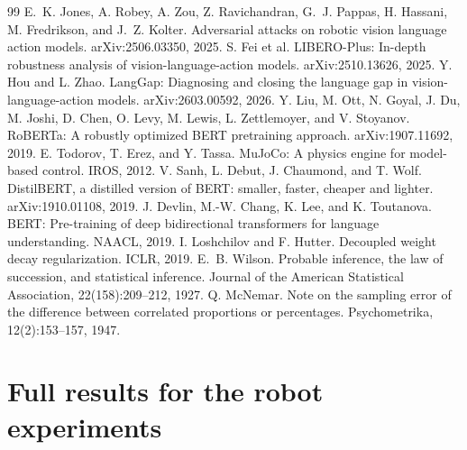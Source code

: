 \documentclass{article}
\begin{document}
\begin{thebibliography}{99}
 E.~K. Jones, A. Robey, A. Zou, Z. Ravichandran, G.~J. Pappas, H. Hassani, M. Fredrikson, and J.~Z. Kolter. Adversarial attacks on robotic vision language action models. arXiv:2506.03350, 2025.
 S. Fei et al. LIBERO-Plus: In-depth robustness analysis of vision-language-action models. arXiv:2510.13626, 2025.
 Y. Hou and L. Zhao. LangGap: Diagnosing and closing the language gap in vision-language-action models. arXiv:2603.00592, 2026.
 Y. Liu, M. Ott, N. Goyal, J. Du, M. Joshi, D. Chen, O. Levy, M. Lewis, L. Zettlemoyer, and V. Stoyanov. RoBERTa: A robustly optimized BERT pretraining approach. arXiv:1907.11692, 2019.
 E. Todorov, T. Erez, and Y. Tassa. MuJoCo: A physics engine for model-based control. IROS, 2012.
 V. Sanh, L. Debut, J. Chaumond, and T. Wolf. DistilBERT, a distilled version of BERT: smaller, faster, cheaper and lighter. arXiv:1910.01108, 2019.
 J. Devlin, M.-W. Chang, K. Lee, and K. Toutanova. BERT: Pre-training of deep bidirectional transformers for language understanding. NAACL, 2019.
 I. Loshchilov and F. Hutter. Decoupled weight decay regularization. ICLR, 2019.
 E.~B. Wilson. Probable inference, the law of succession, and statistical inference. Journal of the American Statistical Association, 22(158):209--212, 1927.
 Q. McNemar. Note on the sampling error of the difference between correlated proportions or percentages. Psychometrika, 12(2):153--157, 1947.
\end{thebibliography}

\appendix

\FloatBarrier
\section{Full results for the robot experiments}
\label{app:robot}
\end{document}
